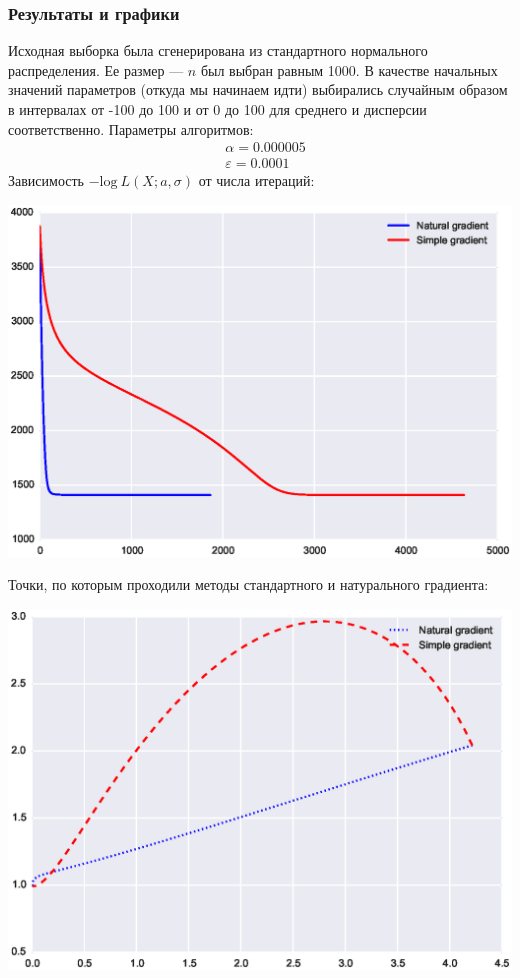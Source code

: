\documentclass[a4paper,12pt]{article}
\begin{document}
        \newpage

\subsubsection{Результаты и графики}

        Исходная выборка была сгенерирована из стандартного нормального распределения. Ее размер --- $n$ был выбран равным 1000.
        В качестве начальных значений параметров (откуда мы начинаем идти) выбирались случайным образом в интервалах от -100 до 100 и от 0 до 100 для среднего и дисперсии соответственно.
        Параметры алгоритмов:
        $$
            \begin{aligned}
                & \alpha = 0.000005 \\
                & \varepsilon = 0.0001
            \end{aligned}
        $$
        Зависимость $-\mbox{log} ~ L(X; a, \sigma)$ от числа итераций:
        \begin{flushleft}
            \includegraphics[scale=0.8, trim=1.5cm 0 0 0]{figure_5}
        \end{flushleft}

        \newpage

        Точки, по которым проходили методы стандартного и натурального градиента:
        \begin{flushleft}
            \includegraphics[scale=0.8, trim=1.5cm 0 0 0]{figure_55}
        \end{flushleft}
\end{document}
